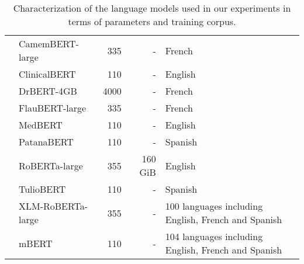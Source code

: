 \begin{table}[ht]
{\begin{tabular}{clrrl}
 & CamemBERT-large & 335 & - & French \\
 & ClinicalBERT & 110 & - & English \\
 & DrBERT-4GB & 4000 & - & French \\
 & FlauBERT-large & 335 & - & French \\
 & MedBERT & 110 & - & English \\
 & PatanaBERT & 110 & - & Spanish \\
 & RoBERTa-large & 355 & 160 GiB & English \\
 & TulioBERT & 110 & - & Spanish \\
 & XLM-RoBERTa-large & 355 & - & 100 languages including English, French and Spanish \\
 & mBERT \cite{devlin2019bert} & 110 & - & 104 languages including English, French and Spanish \\
\bottomrule
\end{tabular}}
\caption{Characterization of the language models used in our experiments in terms of parameters and training corpus.}
\label{tab:LM_features}
\end{table}
